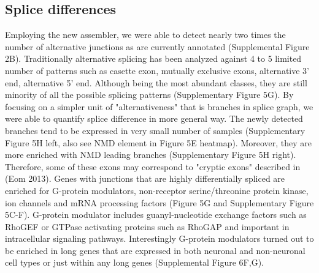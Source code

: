 \subsection{Splice differences}
Employing the new assembler, we were able to detect nearly two times the number of alternative junctions as are currently annotated (Supplemental Figure 2B). Traditionally alternative splicing has been analyzed against 4 to 5 limited number of patterns such as casette exon, mutually exclusive exons, alternative 3' end, alternative 5' end. Although being the most abundant classes, they are still minority of all the possible splicing patterns (Supplementary Figure 5G). By focusing on a simpler unit of "alternativeness" that is branches in splice graph, we were able to quantify splice difference in more general way. The newly detected branches tend to be expressed in very small number of samples (Supplementary Figure 5H left, also see NMD element in Figure 5E heatmap). Moreover, they are more enriched with NMD leading branches (Supplementary Figure 5H right). Therefore, some of these exons may correspond to "cryptic exons" described in (Eom 2013). Genes with junctions that are highly differentially spliced are enriched for G-protein modulators, non-receptor serine/threonine protein kinase, ion channels and mRNA processing factors (Figure 5G and Supplementary Figure 5C-F). G-protein modulator includes guanyl-nucleotide exchange factors such as RhoGEF or GTPase activating proteins such as RhoGAP and important in intracellular signaling pathways. Interestingly G-protein modulators turned out to be enriched in long genes that are expressed in both neuronal and non-neuronal cell types or just within any long genes (Supplemental Figure 6F,G).

